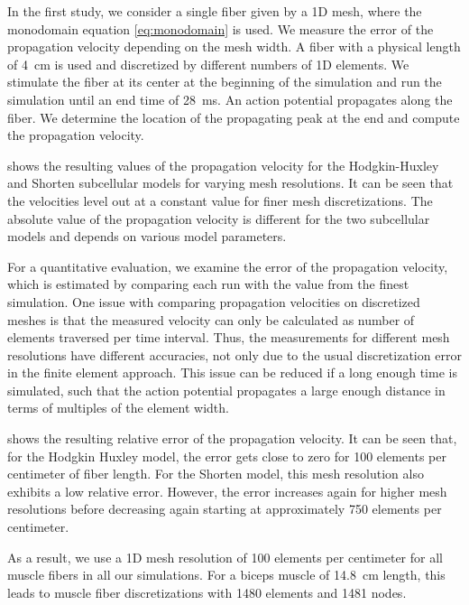 In the first study, we consider a single fiber given by a 1D mesh, where the monodomain equation \cref{eq:monodomain} is used.
We measure the error of the propagation velocity depending on the mesh width. A fiber with a physical length of \SI{4}{\cm} is used and discretized by different numbers of 1D elements. We stimulate the fiber at its center at the beginning of the simulation and run the simulation until an end time of \SI{28}{\ms}. An action potential propagates along the fiber. We determine the location of the propagating peak at the end and compute the propagation velocity.

 shows the resulting values of the propagation velocity for the Hodgkin-Huxley and Shorten subcellular models for varying mesh resolutions. It can be seen that the velocities level out at a constant value for finer mesh discretizations. The absolute value of the propagation velocity is different for the two subcellular models and depends on various model parameters.

For a quantitative evaluation, we examine the error of the propagation velocity, which is estimated by comparing each run with the value from the finest simulation. 
One issue with comparing propagation velocities on discretized meshes is that the measured velocity can only be calculated as number of elements traversed per time interval. Thus, the measurements for different mesh resolutions have different accuracies, not only due to the usual discretization error in the finite element approach. This issue can be reduced if a long enough time is simulated, such that the action potential propagates a large enough distance in terms of multiples of the element width.

 shows the resulting relative error of the propagation velocity. It can be seen that, for the Hodgkin Huxley model, the error gets close to zero for 100 elements per centimeter of fiber length. For the Shorten model, this mesh resolution also exhibits a low relative error. However, the error increases again for higher mesh resolutions before decreasing again starting at approximately 750 elements per centimeter. 

As a result, we use a 1D mesh resolution of 100 elements per centimeter for all muscle fibers in all our simulations. For a biceps muscle of \SI{14.8}{\cm} length, this leads to muscle fiber discretizations with 1480 elements and 1481 nodes.


